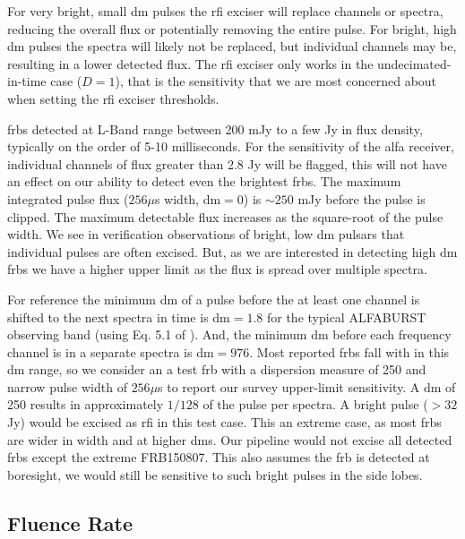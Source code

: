 \documentclass[a4paper,fleqn,usenatbib]{mnras}
\begin{document}
For very bright, small \gls{dm} pulses the \gls{rfi} exciser will replace
channels or spectra, reducing the overall flux or potentially removing the
entire pulse.  For bright, high \gls{dm} pulses the spectra will likely not be
replaced, but individual channels may be, resulting in a lower detected flux.
The \gls{rfi} exciser only works in the undecimated-in-time case ($D=1$), that
is the sensitivity that we are most concerned about when setting the \gls{rfi}
exciser thresholds.

\glspl{frb} detected at L-Band range between 200 mJy to a few Jy in flux
density, typically on the order of 5-10 milliseconds. For the sensitivity of the
\gls{alfa} receiver, individual channels of flux greater than 2.8 Jy will be
flagged, this will not have an effect on our ability to detect even the
brightest \glspl{frb}.  The maximum integrated pulse flux ($256 \mu$s width,
\gls{dm}$=0$) is $\sim250$ mJy before the pulse is clipped. The maximum
detectable flux increases as the square-root of the pulse width.  We see in
verification observations of bright, low \gls{dm} pulsars that individual
pulses are often excised. But, as we are interested in detecting high \gls{dm}
\glspl{frb} we have a higher upper limit as the flux is spread over multiple
spectra.

For reference the minimum \gls{dm} of a pulse before the at least one channel is
shifted to the next spectra in time is \gls{dm}$=1.8$ for the typical ALFABURST
observing band (using Eq. 5.1 of \cite{2004hpa..book.....L}). And, the minimum
\gls{dm} before each frequency channel is in a separate spectra is
\gls{dm}$=976$. Most reported \glspl{frb} fall with in this \gls{dm} range, so
we consider an a test \gls{frb} with a dispersion measure of 250 and narrow
pulse width of $256 \mu$s to report our survey upper-limit sensitivity. A
\gls{dm} of 250 results in approximately $1/128$ of the pulse per spectra. A
bright pulse ($>32$ Jy) would be excised as \gls{rfi} in this test case. This an
extreme case, as most \glspl{frb} are wider in width and at higher \glspl{dm}.
Our pipeline would not excise all detected \glspl{frb} except the extreme
FRB150807.  This also assumes the \gls{frb} is detected at boresight, we would
still be sensitive to such bright pulses in the side lobes.



\subsection{Fluence Rate}
\label{sec:fluence}
\end{document}
